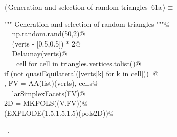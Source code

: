 \documentclass[11pt,oneside]{article}    %
\begin{document}
\begin{flushleft} \small \label{scrap115}
\protect{}$\langle\,$Generation and selection of random triangles\nobreak\ {\footnotesize 61a}$\,\rangle\equiv$
\vspace{-1ex}
\begin{list}{}{} \item
\mbox{}\verb@""" Generation and selection of random triangles """@\\
\mbox{}\verb@verts = np.random.rand(50,2)@\\
\mbox{}\verb@verts = (verts - [0.5,0.5]) * 2@\\
\mbox{}\verb@triangles = Delaunay(verts)@\\
\mbox{}\verb@cells = [ cell for cell in triangles.vertices.tolist()@\\
\mbox{}\verb@         if (not quasiEquilateral([verts[k] for k in cell])) ]@\\
\mbox{}\verb@V, FV = AA(list)(verts), cells@\\
\mbox{}\verb@EV = larSimplexFacets(FV)@\\
\mbox{}\verb@pols2D = MKPOLS((V,FV))@\\
\mbox{}\verb@VIEW(EXPLODE(1.5,1.5,1.5)(pols2D))@\\
\mbox{}\verb@@{\NWsep}
\end{list}
\vspace{-1ex}
\footnotesize\addtolength{\baselineskip}{-1ex}
\begin{list}{}{\setlength{\itemsep}{-\parsep}\setlength{\itemindent}{-\leftmargin}}
\item \NWtxtMacroRefIn\ .
\end{list}
\end{flushleft}
\end{document}

